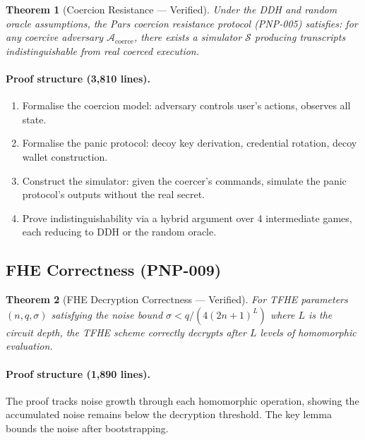 \documentclass[11pt,a4paper]{article}
\newtheorem{theorem}{Theorem}[section]
\begin{document}
\begin{theorem}[Coercion Resistance --- Verified]
\label{thm:coercion}
    Under the DDH and random oracle assumptions, the Pars coercion
    resistance protocol (PNP-005) satisfies: for any coercive adversary
    $\mathcal{A}_{\mathrm{coerce}}$, there exists a simulator
    $\mathcal{S}$ producing transcripts indistinguishable from real
    coerced execution.
\end{theorem}

\paragraph{Proof structure (3{,}810 lines).}
\begin{enumerate}
    \item Formalise the coercion model: adversary controls user's
    actions, observes all state.
    \item Formalise the panic protocol: decoy key derivation, credential
    rotation, decoy wallet construction.
    \item Construct the simulator: given the coercer's commands, simulate
    the panic protocol's outputs without the real secret.
    \item Prove indistinguishability via a hybrid argument over 4
    intermediate games, each reducing to DDH or the random oracle.
\end{enumerate}

\subsection{FHE Correctness (PNP-009)}

\begin{theorem}[FHE Decryption Correctness --- Verified]
\label{thm:fhe}
    For TFHE parameters $(n, q, \sigma)$ satisfying the noise bound
    $\sigma < q/(4(2n+1)^L)$ where $L$ is the circuit depth, the TFHE
    scheme correctly decrypts after $L$ levels of homomorphic evaluation.
\end{theorem}

\paragraph{Proof structure (1{,}890 lines).}
The proof tracks noise growth through each homomorphic operation,
showing the accumulated noise remains below the decryption threshold.
The key lemma bounds the noise after bootstrapping.

\end{document}
